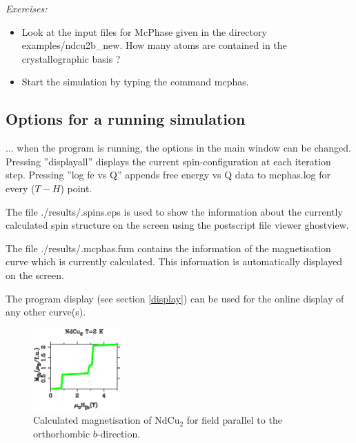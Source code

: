 \vspace{1cm}
{\em Exercises:}
\begin{itemize}
\item Look at the input files for {\prg McPhase} given in the directory
{\prg examples/ndcu2b\_new}.  How many atoms are contained in the crystallographic basis ?
\item
Start the simulation by typing the command {\prg mcphas}.
\end{itemize}



\subsection{Options for a running simulation}
... when the program is running, the options in the main window
can be changed. Pressing ''displayall'' displays the current spin-configuration
at each iteration step. Pressing ''log fe vs Q'' appends free energy vs Q
data to {\prg mcphas.log} for every ($T-H$) point.


The file {\prg ./results/.spins.eps} is used to show the information about the currently calculated
spin structure on the screen using the postscript file viewer ghostview.

The file {\prg ./results/.mcphas.fum} contains the information of the magnetisation curve
which is currently calculated. This information is automatically displayed on the screen.


The program {\prg display} (see section \ref{display}) can be used 
for the online display of any other
curve(s).

\begin{figure}[t]%
\begin{center}\leavevmode
\includegraphics[angle=0, width=0.3\textwidth]{figsrc/magnetization_ndcu2.ps}
\end{center}
\caption{Calculated magnetisation of NdCu$_2$ for field parallel to the orthorhombic $b$-direction.}
\label{magnetization}
\end{figure}

